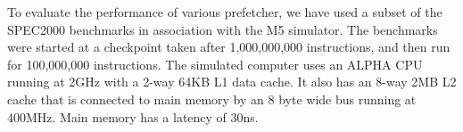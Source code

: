 To evaluate the performance of various prefetcher, we have used
a subset of the SPEC2000 benchmarks in association with the M5
simulator. The benchmarks were started at a checkpoint taken after
1,000,000,000 instructions, and then run for 100,000,000 instructions.
The simulated computer uses an ALPHA CPU running at 2GHz
with a 2-way 64KB L1 data cache. It also has an 8-way 2MB L2 cache that is
connected to main memory by an 8 byte wide bus running at
400MHz. Main memory has a latency of 30ns.
